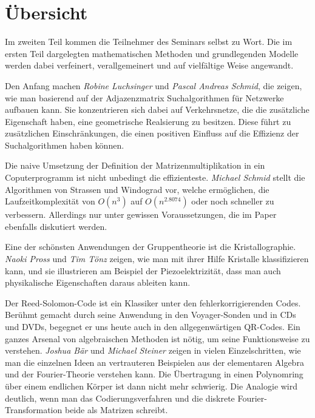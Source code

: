 %
%
%
\chapter*{Übersicht}
\rhead{}
\label{buch:uebersicht}
Im zweiten Teil kommen die Teilnehmer des Seminars selbst zu Wort.
Die im ersten Teil dargelegten mathematischen Methoden und
grundlegenden Modelle werden dabei verfeinert, verallgemeinert
und auf vielfältige Weise angewandt.

Den Anfang machen {\em Robine Luchsinger} und {\em Pascal Andreas Schmid},
%
%
die zeigen, wie man basierend auf der Adjazenzmatrix Suchalgorithmen
für Netzwerke aufbauen kann.
Sie konzentrieren sich dabei auf Verkehrsnetze, die die zusätzliche
Eigenschaft haben, eine geometrische Realsierung zu besitzen.
Diese führt zu zusätzlichen Einschränkungen, die einen positiven
Einfluss auf die Effizienz der Suchalgorithmen haben können.

Die naive Umsetzung der Definition der Matrizenmultiplikation in
ein Coputerprogramm ist nicht unbedingt die effizienteste.
{\em Michael Schmid} stellt die Algorithmen von Strassen und
%
Windograd vor, welche ermöglichen, die Laufzeitkomplexität
von $O(n^3)$ auf $O(n^{2.8074})$ oder noch schneller zu verbessern.
Allerdings nur unter gewissen Voraussetzungen, die im Paper
ebenfalls diskutiert werden.

Eine der schönsten Anwendungen der Gruppentheorie ist die
Kristallographie.
{\em Naoki Pross} und {\em Tim Tönz} zeigen, wie man mit ihrer
%
%
Hilfe Kristalle klassifizieren kann, und sie illustrieren am Beispiel
der Piezoelektrizität, dass man auch physikalische Eigenschaften daraus
ableiten kann.

Der Reed-Solomon-Code ist ein Klassiker unter den fehlerkorrigierenden
Codes.
Berühmt gemacht durch seine Anwendung in den Voyager-Sonden und in CDs
und DVDs, begegnet er uns heute auch in den allgegenwärtigen QR-Codes.
Ein ganzes Arsenal von algebraischen Methoden ist nötig, um seine
Funktionsweise zu verstehen.
{\em Joshua Bär} und {\em Michael Steiner} zeigen in vielen Einzelschritten,
%
%
wie man die einzelnen Ideen an vertrauteren Beispielen aus der
elementaren Algebra und der Fourier-Theorie verstehen kann.
Die Übertragung in einen Polynomring über einem endlichen Körper 
ist dann nicht mehr schwierig.
Die Analogie wird deutlich, wenn man das Codierungsverfahren und
die diskrete Fourier-Transformation beide als Matrizen schreibt.

